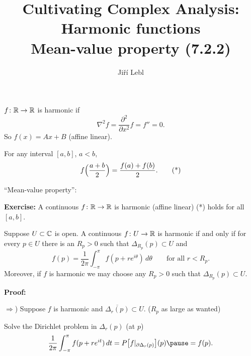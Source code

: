 \documentclass[10pt,aspectratio=169]{beamer}
\author{Ji\v{r}\'i Lebl}
\institute[OSU]{%
Departemento pri Matematiko de Oklahoma {\^S}tata Universitato}
\title{Cultivating Complex Analysis:\\%
Harmonic functions\\%
Mean-value property (7.2.2)}
\date{}
\begin{document}
\begin{frame}
\titlepage
\end{frame}

\begin{frame}
$f \colon {\mathbb{R}} \to {\mathbb{R}}$ is harmonic if
\pause
\[
\nabla^2 f = 
\frac{\partial^2}{\partial x^2} f = f'' = 0 .
\]
\pause
So $f(x) = Ax+B$ (affine linear).

\medskip
\pause

For any interval $[a,b]$, $a < b$,
\[
f\Bigl(\frac{a+b}{2}\Bigr) = \frac{f(a)+f(b)}{2} . \tag{*}
\]

\medskip
\pause

``Mean-value property'':

\medskip

\textbf{Exercise:} A continuous $f \colon {\mathbb{R}} \to {\mathbb{R}}$ is harmonic (affine linear) \wiffif (*) holds
for all $[a,b]$.
\end{frame}

\begin{frame}
\begin{theorem}
Suppose $U \subset {\mathbb{C}}$ is open.
A continuous 
$f \colon U \to {\mathbb{R}}$
is harmonic if and only if 
for every $p \in U$ there is an $R_p > 0$ such that
$\Delta_{R_p}(p) \subset U$ and
\begin{equation*}
f(p) = \frac{1}{2\pi} \int_{-\pi}^{\pi} f(p+re^{i\theta})\, d\theta
\qquad \text{for all } r < R_p .
\end{equation*}
Moreover, if $f$ is harmonic we may choose any $R_p > 0$ such that
$\Delta_{R_p}(p) \subset U$.
\end{theorem}

\pause
\textbf{Proof:}

$\Rightarrow$) \pause
Suppose $f$ is harmonic and $\overline{\Delta_r(p)} \subset U$. 
\pause
($R_p$ as large as wanted)
\pause

Solve the Dirichlet problem in $\Delta_r(p)$ (at $p$)
\begin{equation*}
\frac{1}{2\pi} \int_{-\pi}^{\pi}f(p + r e^{it}) \, dt =
P\bigl[f|_{\partial \Delta_r(p)}\big](p) \pause = f(p) .
\end{equation*}

\end{frame}
\end{document}
